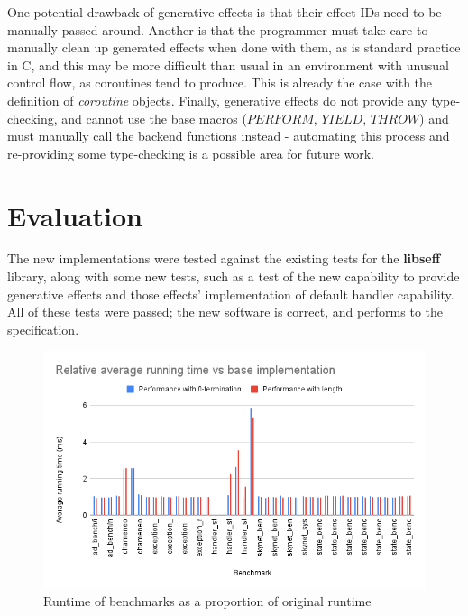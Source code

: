 \documentclass[logo,bsc,singlespacing,parskip,online]{infthesis}
\begin{document}
One potential drawback of generative effects is that their effect IDs need to be manually passed around. Another is that the programmer must take care to manually clean up generated effects when done with them, as is standard practice in C, and this may be more difficult than usual in an environment with unusual control flow, as coroutines tend to produce. This is already the case with the definition of \textit{coroutine} objects. Finally, generative effects do not provide any type-checking, and cannot use the base macros ($PERFORM$, $YIELD$, $THROW$) and must manually call the backend functions instead - automating this process and re-providing some type-checking is a possible area for future work.





\chapter{Evaluation} \label{eval}

The new implementations were tested against the existing tests for the \textbf{libseff} library, along with some new tests, such as a test of the new capability to provide generative effects and those effects' implementation of default handler capability. All of these tests were passed; the new software is correct, and performs to the specification.

\begin{figure}[ht]
    \centering
    \includegraphics[width=1\linewidth]{all.png}
    \caption{Runtime of benchmarks as a proportion of original runtime}
    \label{fig:many}
\end{figure}
\end{document}

